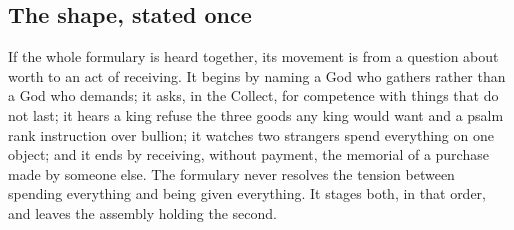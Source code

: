 \subsection*{The shape, stated once}

If the whole formulary is heard together, its movement is from a question about worth to an act of receiving. It begins by naming a God who gathers rather than a God who demands; it asks, in the Collect, for competence with things that do not last; it hears a king refuse the three goods any king would want and a psalm rank instruction over bullion; it watches two strangers spend everything on one object; and it ends by receiving, without payment, the memorial of a purchase made by someone else. The formulary never resolves the tension between spending everything and being given everything. It stages both, in that order, and leaves the assembly holding the second.
